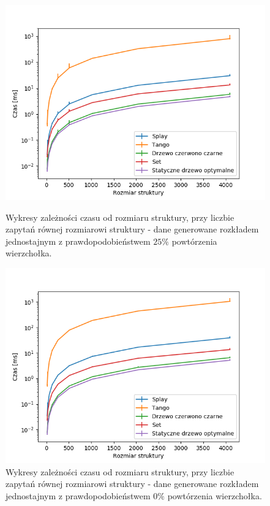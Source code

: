 \documentclass[declaration,shortabstract]{iithesis}
\theoremstyle{thm}
\theoremstyle{remark}
\theoremstyle{plain}
\theoremstyle{plain}
\theoremstyle{plain}
\begin{document}
\begin{figure}[ht]
\begin{minipage}[b]{.45\textwidth}
\centering
\includegraphics[width=1\textwidth]{wykresy/uniform75_main.png}
\caption{Wykresy zależności czasu od rozmiaru struktury, przy liczbie zapytań równej rozmiarowi struktury - dane generowane rozkładem jednostajnym z prawdopodobieństwem  \(25\%\) powtórzenia wierzchołka. }
\end{minipage}
\hfill
\begin{minipage}[b]{.45\textwidth}
\centering
\includegraphics[width=1\textwidth]{wykresy/uniform100_main.png}
\caption{Wykresy zależności czasu od rozmiaru struktury, przy liczbie zapytań równej rozmiarowi struktury - dane generowane rozkładem jednostajnym z prawdopodobieństwem  \(0\%\) powtórzenia wierzchołka.}
\end{minipage}
\end{figure}
\end{document}
